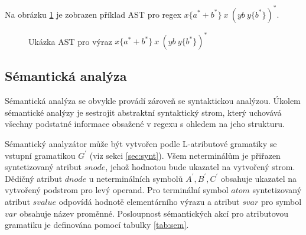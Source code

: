 \documentclass[thesis=B,czech]{FITthesis}[2019/12/23]
\theoremstyle{definition}
\begin{document}
Na obrázku \ref{fig:ast} je zobrazen příklad AST pro regex $x\{a^\ast+b^\ast\} \ x \ (yb \ y \{b^\ast\})^\ast$.

\begin{figure}[h]
\centering

\caption{Ukázka AST pro výraz  $x\{a^\ast+b^\ast\} \ x \ (yb \ y \{b^\ast\})^\ast$}\label{fig:ast}
\end{figure}

\subsection{Sémantická analýza}\label{sec:semantic}
Sémantická analýza se obvykle provádí zároveň se syntaktickou analýzou. Úkolem sémantické analýzy je sestrojit abstraktní syntaktický strom, který uchovává všechny podstatné informace obsažené v regexu s ohledem na jeho strukturu. 

Sémantický analyzátor může být vytvořen podle L-atributové gramatiky se vstupní gramatikou $G^\prime$ (viz sekci \ref{sec:synt}). Všem neterminálům je přiřazen syntetizovaný atribut $snode$, jehož hodnotou bude ukazatel na vytvořený strom. Dědičný atribut $dnode$ u neterminálních symbolů $A^\prime, B^\prime, C^\prime$ obsahuje ukazatel na vytvořený podstrom pro levý operand. Pro terminální symbol $atom$ syntetizovaný atribut $svalue$ odpovídá hodnotě elementárního výrazu a atribut $svar$ pro symbol $var$ obsahuje název proměnné.
Posloupnost sémantických akcí pro atributovou gramatiku je definována pomocí tabulky \ref{tab:sem}.
\end{document}
